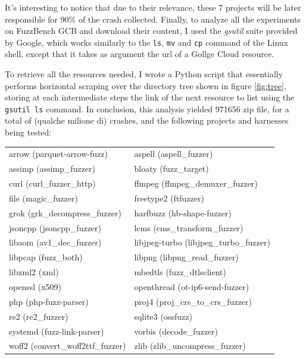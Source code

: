 It's interesting to notice that due to their relevance, these 7 projects will be later responsible for 90\% of the crash collected.
Finally, to analyze all the experiments on FuzzBench GCB and download their content, I used the \textit{gsutil} suite provided by Google, which works similarly to the \verb|ls|, \verb|mv| and \verb|cp| command of the Linux shell, except that it takes as argument the url of a Gollge Cloud resource.

To retrieve all the resources needed, I wrote a Python script that essentially performs horizontal scraping over the directory tree shown in figure \ref{fig:tree}, storing at each intermediate steps the link of the next resource to list using the \verb|gsutil ls| command.
In conclusion, this analysis yielded 971656 zip file, for a total of (qualche milione di) crashes, and the following projects and harnesses being tested:

\noindent
\begin{tabularx}{\textwidth}{
    @{\hspace{2em}}%
    >{\leavevmode\llap{\textbullet~}\raggedright\rule{0pt}{3ex}}%
    X%
    @{\quad\hspace{1em}}%
    >{\leavevmode\llap{\textbullet~}\raggedright\arraybackslash}%
    X%
    @{}%
  }
  arrow (parquet-arrow-fuzz) & aspell (aspell\_fuzzer) \\
  assimp (assimp\_fuzzer) & bloaty (fuzz\_target) \\
  curl (curl\_fuzzer\_http) & ffmpeg (ffmpeg\_demuxer\_fuzzer) \\
  file (magic\_fuzzer) & freetype2 (ftfuzzer) \\
  grok (grk\_decompress\_fuzzer) & harfbuzz (hb-shape-fuzzer) \\
  jsoncpp (jsoncpp\_fuzzer) & lcms (cms\_transform\_fuzzer) \\
  libaom (av1\_dec\_fuzzer) & libjpeg-turbo (libjpeg\_turbo\_fuzzer) \\
  libpcap (fuzz\_both) & libpng (libpng\_read\_fuzzer) \\
  libxml2 (xml) & mbedtls (fuzz\_dtlsclient) \\
  openssl (x509) & openthread (ot-ip6-send-fuzzer) \\
  php (php-fuzz-parser) & proj4 (proj\_crs\_to\_crs\_fuzzer) \\
  re2 (re2\_fuzzer) & sqlite3 (ossfuzz) \\
  systemd (fuzz-link-parser) & vorbis (decode\_fuzzer) \\
  woff2 (convert\_woff2ttf\_fuzzer) & zlib (zlib\_uncompress\_fuzzer)  
\end{tabularx}



